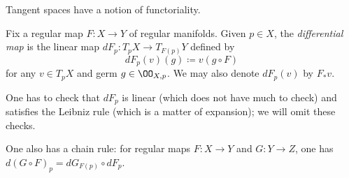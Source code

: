 \documentclass[../notes.tex]{subfiles}
\begin{document}
Tangent spaces have a notion of functoriality.
\begin{definition}
	Fix a regular map $F\colon X\to Y$ of regular manifolds. Given $p\in X$, the \textit{differential map} is the linear map $dF_p\colon T_pX\to T_{F(p)}Y$ defined by
	\[dF_p(v)(g)\coloneqq v(g\circ F)\]
	for any $v\in T_pX$ and germ $g\in\OO_{X,p}$. We may also denote $dF_p(v)$ by $F_*v$.
\end{definition}
One has to check that $dF_p$ is linear (which does not have much to check) and satisfies the Leibniz rule (which is a matter of expansion); we will omit these checks.
\begin{remark}
	One also has a chain rule: for regular maps $F\colon X\to Y$ and $G\colon Y\to Z$, one has $d(G\circ F)_p=dG_{F(p)}\circ dF_p$.
\end{remark}
\end{document}
